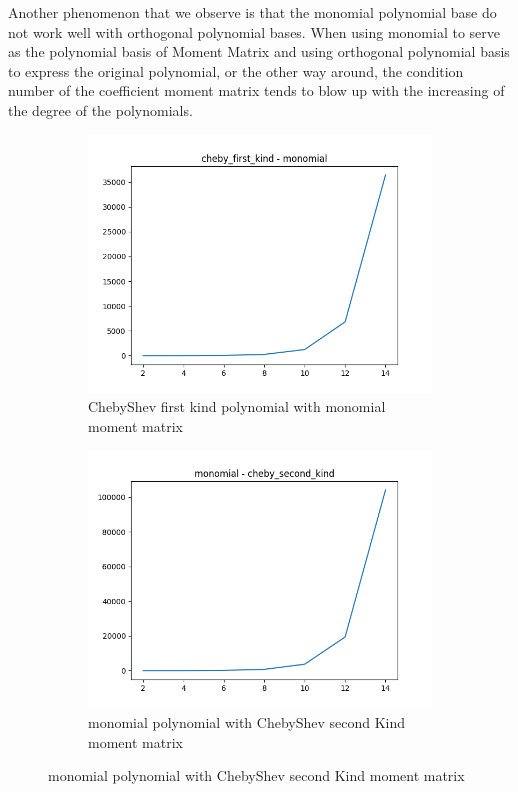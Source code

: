 \documentclass[12pt]{amsart}
\numberwithin{equation}{section}
\theoremstyle{definition}
\numberwithin{thm}{section}
\begin{document}
Another phenomenon that we observe is that the monomial polynomial base do not work well
with orthogonal polynomial bases. When using monomial to serve as the polynomial basis of Moment Matrix
and using orthogonal polynomial basis to express the original polynomial,
or the other way around, 
the condition number of the coefficient moment matrix tends 
to blow up with the increasing of the degree of the polynomials.

\begin{figure}[h]
     \centering
     \begin{subfigure}[b]{0.475\textwidth}
         \centering
         \includegraphics[width=\textwidth]{imgs/cheby_first_kind_monomial.png}
         \caption[ChebyShev First Kind polynomial with monomial moment matrix]%
         {\small ChebyShev first kind polynomial with monomial moment matrix}%

     \end{subfigure}
     \hfill
     \begin{subfigure}[b]{0.475\textwidth}  
         \centering 
         \includegraphics[width=\textwidth]{imgs/monomial_cheby_second_kind.png}
         \caption[monomial polynomial with ChebyShev second Kind moment matrix]%
         {\small monomial polynomial with ChebyShev second Kind moment matrix}%
 

\end{subfigure}
\end{figure}
\end{document}

